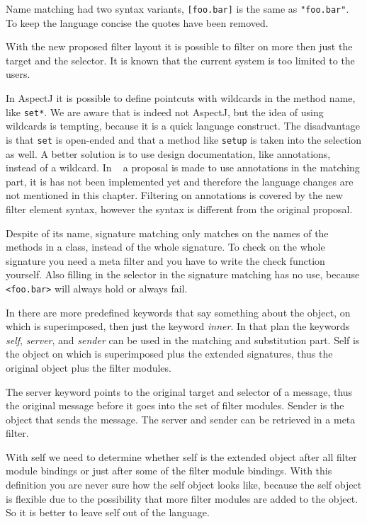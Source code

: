 Name matching had two syntax variants, \lstinline![foo.bar]! is the same as
\lstinline!"foo.bar"!. To keep the language concise the quotes have been removed.

With the new proposed filter layout \cite{Doornenbal2006} 
it is possible to filter on more then just the target and the selector. It is known that the current system is too limited
to the users.

In AspectJ it is possible to define pointcuts with wildcards in the method name, like \lstinline!set*!. We are aware
that \Compose* is indeed not AspectJ, but the idea of using wildcards is tempting, because it is a quick language
construct. The disadvantage is that \lstinline!set! is open-ended and that a method like \lstinline!setup! is taken into the selection as well. A better solution is to use design documentation, like annotations, instead of a wildcard.
In ~\cite{Nagy2006} a proposal is made to use annotations in the matching part, it is has not been implemented yet and therefore the language changes are not mentioned in this chapter. Filtering on annotations is covered by the new filter element syntax, however the syntax is different from the original proposal.

Despite of its name, signature matching only matches on the names of the methods in a class, instead of
the whole signature. To check on the whole signature you need a meta filter and you have to write the check function
yourself. Also filling in the selector in the signature matching has no use, because \lstinline|<foo.bar>| will
always hold or always fail.

In \cite{bergmans:phd94} there are more predefined keywords that say something about the object, on which is superimposed, then just the keyword \emph{inner}. In that plan the keywords \emph{self}, \emph{server}, and \emph{sender} can be used in the matching and substitution part. Self is the object on which is superimposed plus the extended signatures, thus the original object plus the filter modules.

The server keyword points to the original target and selector of a message, thus the original message before it goes into the set of filter modules. Sender is the object that sends the message. The server and sender can be retrieved in a meta filter.

With self we need to determine whether self is the extended object after all filter module bindings or just after some of the filter module bindings. With this definition you are never sure
how the self object looks like, because the self object is flexible due to the possibility that more filter modules are added to the object. So it is better to leave self out of the language.

